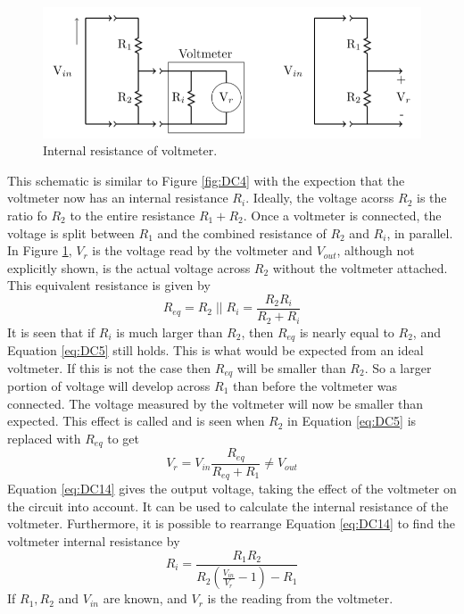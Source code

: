 \documentclass[12pt, a4paper, oneside, openright, titlepage]{book}
\begin{document}
\begin{figure}[H]
    \centering
    \includegraphics[scale = 0.8]{Images/DC10.PNG}
    \caption{Internal resistance of voltmeter.}
    \label{fig:DC10}
\end{figure}

This schematic is similar to Figure \ref{fig:DC4} with the expection that the voltmeter now has an internal resistance $R_i$. Ideally, the voltage acorss $R_2$ is the ratio fo $R_2$ to the entire resistance $R_1+R_2$. Once a voltmeter is connected, the voltage is split between $R_1$ and the combined resistance of $R_2$ and $R_i$, in parallel. In Figure \ref{fig:DC10}, $V_r$ is the voltage read by the voltmeter and $V_{out}$, although not explicitly shown, is the actual voltage across $R_2$ without the voltmeter attached. This equivalent resistance is given by \begin{equation}\label{eq:DC13}
    R_{eq} = R_2\;\vert\vert\;R_i = \frac{R_2R_i}{R_2+R_i}
\end{equation}
It is seen that if $R_i$ is much larger than $R_2$, then $R_{eq}$ is nearly equal to $R_2$, and Equation \ref{eq:DC5} still holds. This is what would be expected from an ideal voltmeter. If this is not the case then $R_{eq}$ will be smaller than $R_2$. So a larger portion of voltage will develop across $R_1$ than before the voltmeter was connected. The voltage measured by the voltmeter will now be smaller than expected. This effect is called  and is seen when $R_2$ in Equation \ref{eq:DC5} is replaced with $R_{eq}$ to get \begin{equation}\label{eq:DC14}
    V_r = V_{in}\frac{R_{eq}}{R_{eq}+R_1} \neq V_{out}
\end{equation}
Equation \ref{eq:DC14} gives the output voltage, taking the effect of the voltmeter on the circuit into account. It can be used to calculate the internal resistance of the voltmeter. Furthermore, it is possible to rearrange Equation \ref{eq:DC14} to find the voltmeter internal resistance by \begin{equation}\label{eq:DC15}
    R_i = \frac{R_1R_2}{R_2\left(\frac{V_{in}}{V_r}-1\right)-R_1}
\end{equation}
If $R_1,R_2$ and $V_{in}$ are known, and $V_r$ is the reading from the voltmeter.
\end{document}
